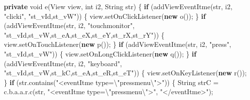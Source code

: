 \documentclass[
]{article}
\newenvironment{Shaded}{}{}
\newcommand{\BuiltInTok}[1]{\textcolor[rgb]{0.00,0.50,0.00}{#1}}
\newcommand{\ControlFlowTok}[1]{\textcolor[rgb]{0.00,0.44,0.13}{\textbf{#1}}}
\newcommand{\DataTypeTok}[1]{\textcolor[rgb]{0.56,0.13,0.00}{#1}}
\newcommand{\FunctionTok}[1]{\textcolor[rgb]{0.02,0.16,0.49}{#1}}
\newcommand{\KeywordTok}[1]{\textcolor[rgb]{0.00,0.44,0.13}{\textbf{#1}}}
\newcommand{\NormalTok}[1]{#1}
\newcommand{\OperatorTok}[1]{\textcolor[rgb]{0.40,0.40,0.40}{#1}}
\newcommand{\SpecialCharTok}[1]{\textcolor[rgb]{0.25,0.44,0.63}{#1}}
\newcommand{\StringTok}[1]{\textcolor[rgb]{0.25,0.44,0.63}{#1}}
\begin{document}
\begin{Shaded}
\begin{Highlighting}[]
    \KeywordTok{private} \DataTypeTok{void} \FunctionTok{e}\OperatorTok{(}\BuiltInTok{View}\NormalTok{ view}\OperatorTok{,} \DataTypeTok{int}\NormalTok{ i2}\OperatorTok{,} \BuiltInTok{String}\NormalTok{ str}\OperatorTok{)} \OperatorTok{\{}
        \ControlFlowTok{if} \OperatorTok{(}\FunctionTok{addViewEventItme}\OperatorTok{(}\NormalTok{str}\OperatorTok{,}\NormalTok{ i2}\OperatorTok{,} \StringTok{"clicki"}\OperatorTok{,} \StringTok{"st\_vId,st\_vW"}\OperatorTok{))} \OperatorTok{\{}
\NormalTok{            view}\OperatorTok{.}\FunctionTok{setOnClickListener}\OperatorTok{(}\KeywordTok{new} \FunctionTok{o}\OperatorTok{());}
        \OperatorTok{\}}
        \ControlFlowTok{if} \OperatorTok{(}\FunctionTok{addViewEventItme}\OperatorTok{(}\NormalTok{str}\OperatorTok{,}\NormalTok{ i2}\OperatorTok{,} \StringTok{"touchmonitor"}\OperatorTok{,} \StringTok{"st\_vId,st\_vW,st\_eA,st\_eX,st\_eY,st\_rX,st\_rY"}\OperatorTok{))} \OperatorTok{\{}
\NormalTok{            view}\OperatorTok{.}\FunctionTok{setOnTouchListener}\OperatorTok{(}\KeywordTok{new} \FunctionTok{p}\OperatorTok{());}
        \OperatorTok{\}}
        \ControlFlowTok{if} \OperatorTok{(}\FunctionTok{addViewEventItme}\OperatorTok{(}\NormalTok{str}\OperatorTok{,}\NormalTok{ i2}\OperatorTok{,} \StringTok{"press"}\OperatorTok{,} \StringTok{"st\_vId,st\_vW"}\OperatorTok{))} \OperatorTok{\{}
\NormalTok{            view}\OperatorTok{.}\FunctionTok{setOnLongClickListener}\OperatorTok{(}\KeywordTok{new} \FunctionTok{q}\OperatorTok{());}
        \OperatorTok{\}}
        \ControlFlowTok{if} \OperatorTok{(}\FunctionTok{addViewEventItme}\OperatorTok{(}\NormalTok{str}\OperatorTok{,}\NormalTok{ i2}\OperatorTok{,} \StringTok{"keyboard"}\OperatorTok{,} \StringTok{"st\_vId,st\_vW,st\_kC,st\_eA,st\_eR,st\_eT"}\OperatorTok{))} \OperatorTok{\{}
\NormalTok{            view}\OperatorTok{.}\FunctionTok{setOnKeyListener}\OperatorTok{(}\KeywordTok{new} \FunctionTok{r}\OperatorTok{());}
        \OperatorTok{\}}
        \ControlFlowTok{if} \OperatorTok{(}\NormalTok{str}\OperatorTok{.}\FunctionTok{contains}\OperatorTok{(}\StringTok{"\textless{}eventItme type=}\SpecialCharTok{\textbackslash{}"}\StringTok{pressmenu}\SpecialCharTok{\textbackslash{}"}\StringTok{\textgreater{}"}\OperatorTok{))} \OperatorTok{\{}
            \BuiltInTok{String}\NormalTok{ strC }\OperatorTok{=}\NormalTok{ c}\OperatorTok{.}\FunctionTok{b}\OperatorTok{.}\FunctionTok{a}\OperatorTok{.}\FunctionTok{a}\OperatorTok{.}\FunctionTok{r}\OperatorTok{.}\FunctionTok{c}\OperatorTok{(}\NormalTok{str}\OperatorTok{,} \StringTok{"\textless{}eventItme type=}\SpecialCharTok{\textbackslash{}"}\StringTok{pressmenu}\SpecialCharTok{\textbackslash{}"}\StringTok{\textgreater{}"}\OperatorTok{,} \StringTok{"\textless{}/eventItme\textgreater{}"}\OperatorTok{);}

\end{Highlighting}
\end{Shaded}
\end{document}
